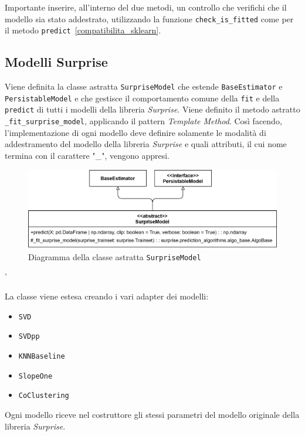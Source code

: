 Importante inserire, all'interno del due metodi, un controllo che verifichi che il modello sia stato addestrato, utilizzando la funzione \texttt{check\_is\_fitted} come per il metodo \texttt{predict}~\ref{compatibilita_sklearn}.

\subsection{Modelli Surprise}

Viene definita la classe astratta \texttt{SurpriseModel} che estende \texttt{BaseEstimator} e \texttt{PersistableModel} e che gestisce il comportamento comune della \texttt{fit} e della \texttt{predict} di tutti i modelli della libreria \textit{Surprise}. Viene definito il metodo astratto \texttt{\_fit\_surprise\_model}, applicando il pattern \textit{Template Method}. Così facendo, l'implementazione di ogni modello deve definire solamente le modalità di addestramento del modello della libreria \textit{Surprise} e quali attributi, il cui nome termina con il carattere "\_", vengono appresi.

\begin{figure}[H]
    \centering
    \includegraphics[scale=0.17]{figures/UML/models/surprise_model.png}
    \caption{Diagramma della classe astratta \texttt{SurpriseModel}}
\end{figure}'


La classe viene estesa creando i vari adapter dei modelli:

\begin{itemize}
    \item \texttt{SVD}
    \item \texttt{SVDpp}
    \item \texttt{KNNBaseline}
    \item \texttt{SlopeOne}
    \item \texttt{CoClustering}
\end{itemize}

Ogni modello riceve nel costruttore gli stessi parametri del modello originale della libreria \textit{Surprise}.

